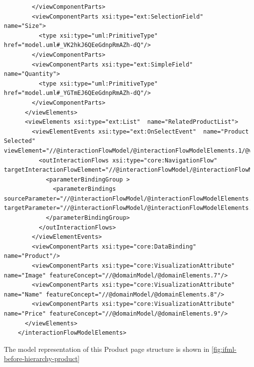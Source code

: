 \begin{lstlisting}
        </viewComponentParts>
        <viewComponentParts xsi:type="ext:SelectionField"  name="Size">
          <type xsi:type="uml:PrimitiveType" href="model.uml#_VK2hkJ6QEeGdnpRmAZh-dQ"/>
        </viewComponentParts>
        <viewComponentParts xsi:type="ext:SimpleField"  name="Quantity">
          <type xsi:type="uml:PrimitiveType" href="model.uml#_YGTmEJ6QEeGdnpRmAZh-dQ"/>
        </viewComponentParts>
      </viewElements>
      <viewElements xsi:type="ext:List"  name="RelatedProductList">
        <viewElementEvents xsi:type="ext:OnSelectEvent"  name="Product Selected" viewElement="//@interactionFlowModel/@interactionFlowModelElements.1/@viewElements.2">
          <outInteractionFlows xsi:type="core:NavigationFlow"  targetInteractionFlowElement="//@interactionFlowModel/@interactionFlowModelElements.1">
            <parameterBindingGroup >
              <parameterBindings  sourceParameter="//@interactionFlowModel/@interactionFlowModelElements.0/@viewElements.2/@parameters.0" targetParameter="//@interactionFlowModel/@interactionFlowModelElements.1/@parameters.0"/>
            </parameterBindingGroup>
          </outInteractionFlows>
        </viewElementEvents>
        <viewComponentParts xsi:type="core:DataBinding"  name="Product"/>
        <viewComponentParts xsi:type="core:VisualizationAttribute"  name="Image" featureConcept="//@domainModel/@domainElements.7"/>
        <viewComponentParts xsi:type="core:VisualizationAttribute"  name="Name" featureConcept="//@domainModel/@domainElements.8"/>
        <viewComponentParts xsi:type="core:VisualizationAttribute"  name="Price" featureConcept="//@domainModel/@domainElements.9"/>
      </viewElements>
    </interactionFlowModelElements>
\end{lstlisting}

\newpage
The model representation of this Product page structure is shown in \ref{fig:ifml-before-hierarchy-product}

